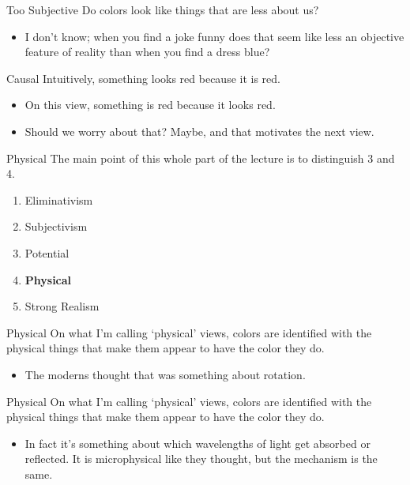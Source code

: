 \documentclass[
  17pt,
  letterpaper,
  ignorenonframetext,
  aspectratio=169,
  handout]{beamer}
\providecommand{\tightlist}{%
  \setlength{\itemsep}{0pt}\setlength{\parskip}{0pt}}\usepackage{longtable,booktabs,array}
\begin{document}
\begin{frame}{Too Subjective}
\protect\hypertarget{too-subjective}{}
Do colors look like things that are less about us?

\begin{itemize}[<+->]
\tightlist
\item
  I don't know; when you find a joke funny does that seem like less an
  objective feature of reality than when you find a dress blue?
\end{itemize}
\end{frame}

\begin{frame}{Causal}
\protect\hypertarget{causal}{}
Intuitively, something looks red because it is red.

\begin{itemize}[<+->]
\tightlist
\item
  On this view, something is red because it looks red.
\item
  Should we worry about that? Maybe, and that motivates the next view.
\end{itemize}
\end{frame}

\begin{frame}{Physical}
\protect\hypertarget{physical}{}
The main point of this whole part of the lecture is to distinguish 3 and
4.

\begin{enumerate}[<+->]
\tightlist
\item
  Eliminativism
\item
  Subjectivism
\item
  Potential
\item
  \textbf{Physical}
\item
  Strong Realism
\end{enumerate}
\end{frame}

\begin{frame}{Physical}
\protect\hypertarget{physical-1}{}
On what I'm calling `physical' views, colors are identified with the
physical things that make them appear to have the color they do.

\begin{itemize}[<+->]
\tightlist
\item
  The moderns thought that was something about rotation.
\end{itemize}
\end{frame}

\begin{frame}{Physical}
\protect\hypertarget{physical-2}{}
On what I'm calling `physical' views, colors are identified with the
physical things that make them appear to have the color they do.

\begin{itemize}[<+->]
\tightlist
\item
  In fact it's something about which wavelengths of light get absorbed
  or reflected. It is microphysical like they thought, but the mechanism
  is the same.
\end{itemize}
\end{frame}
\end{document}
